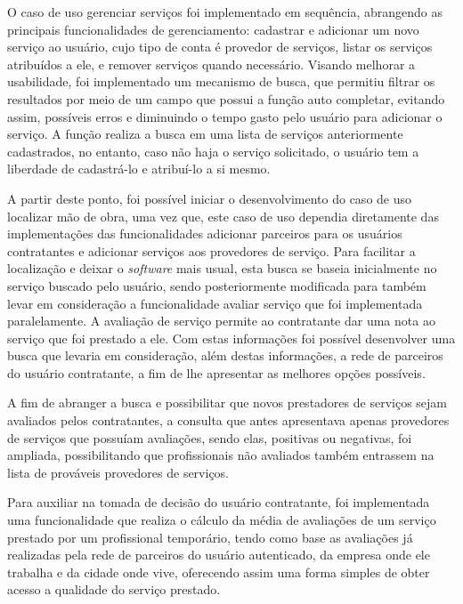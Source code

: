 \par O caso de uso gerenciar serviços foi implementado em sequência, abrangendo as principais funcionalidades de gerenciamento: cadastrar e adicionar um novo serviço ao usuário, cujo tipo de conta é provedor de serviços, listar os serviços atribuídos a ele, e remover serviços quando necessário. Visando melhorar a usabilidade, foi implementado um mecanismo de busca, que permitiu filtrar os resultados por meio de um campo que possui a função  auto completar, evitando assim, possíveis erros e diminuindo o tempo gasto pelo usuário para adicionar o serviço. A função realiza a busca em uma lista de serviços anteriormente cadastrados, no entanto, caso não haja o serviço solicitado, o usuário tem a liberdade de cadastrá-lo e atribuí-lo a si mesmo.

\par A partir deste ponto, foi possível iniciar o desenvolvimento do caso de uso localizar mão de obra, uma vez que, este caso de uso dependia diretamente das implementações das funcionalidades adicionar parceiros para os usuários contratantes e adicionar serviços aos provedores de serviço. Para facilitar a localização e deixar o \textit{software} mais usual, esta busca se baseia inicialmente no serviço buscado pelo usuário, sendo posteriormente modificada para também levar em consideração a funcionalidade avaliar serviço que foi implementada paralelamente. A avaliação de serviço permite ao contratante dar uma nota ao serviço que foi prestado a ele. Com estas informações foi possível desenvolver uma busca que levaria em consideração, além destas informações, a rede de parceiros do usuário contratante, a fim de lhe apresentar as melhores opções possíveis.

\par A fim de abranger a busca e possibilitar que novos prestadores de serviços sejam avaliados pelos contratantes, a consulta que antes apresentava apenas provedores de serviços que possuíam avaliações, sendo elas, positivas ou negativas, foi ampliada, possibilitando que profissionais não avaliados também entrassem na lista de prováveis provedores de serviços.

\par Para auxiliar na tomada de decisão do usuário contratante, foi implementada uma funcionalidade que realiza o cálculo da média de avaliações de um serviço prestado por um profissional temporário, tendo como base as avaliações já realizadas pela rede de parceiros do usuário autenticado, da empresa onde ele trabalha e da cidade onde vive, oferecendo assim uma forma simples de obter acesso a qualidade do serviço prestado.

